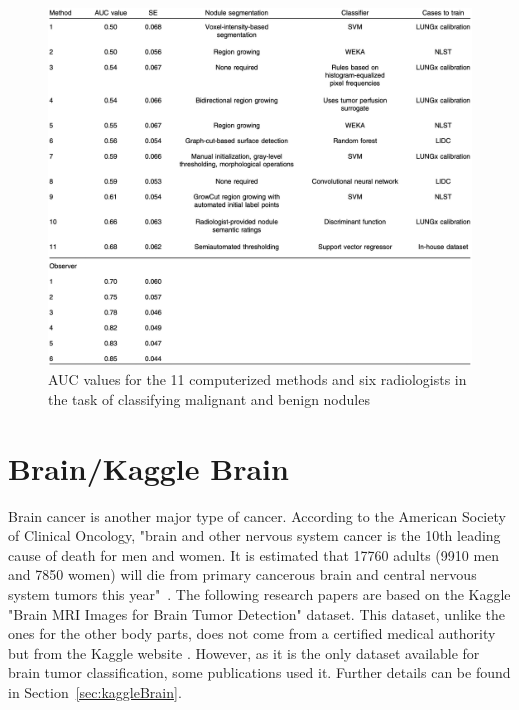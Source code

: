 \begin{figure}[!h]
\centering
\includegraphics[width=1\textwidth, keepaspectratio=true]{./figures/LUNGx_challenge_all_results.png}
\caption{AUC values for the 11 computerized methods and six radiologists in the task of classifying malignant and benign nodules~\cite{12}}
\label{fig:LUNGx_challenge_all_results}
\end{figure}



\section{Brain/Kaggle Brain}

\setlength{\marginparwidth}{3cm}\leavevmode {}Brain cancer is another major type of cancer. According to the American Society of Clinical Oncology, "brain and other nervous system cancer is the 10th leading cause of death for men and women. It is estimated that 17760 adults (9910 men and 7850 women) will die from primary cancerous brain and central nervous system tumors this year"~\cite{43}. The following research papers are based on the Kaggle "Brain MRI Images for Brain Tumor Detection" dataset. This dataset, unlike the ones for the other body parts, does not come from a certified medical authority but from the Kaggle website \cite{45}. However, as it is the only dataset available for brain tumor classification, some publications used it. Further details can be found in \mbox{Section \ref{sec:kaggleBrain}}.

